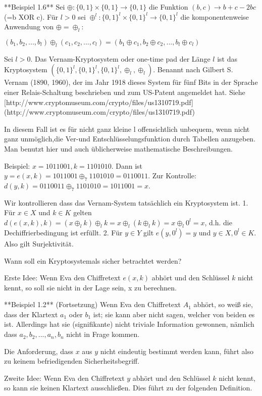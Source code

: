 \documentclass[a4paper]{article}
\begin{document}
\begin{multicols}{3}
**Beispiel 1.6** Sei $\oplus:\{0,1\}\times\{0,1\}\rightarrow\{0,1\}$ die Funktion $(b,c)\rightarrow b+c-2bc$ (=b XOR c).
Für $l>0$ sei $\oplus^l:\{0,1\}^l\times\{0,1\}^l\rightarrow\{0,1\}^l$ die komponentenweise Anwendung von $\oplus=\oplus_l$:

$(b_1,b_2,...,b_l)\oplus_l(c_1,c_2,...,c_l) = (b_1\oplus c_1,b_2\oplus c_2,...,b_l\oplus c_l)$

Sei $l>0$. Das Vernam-Kryptosystem oder one-time pad der Länge $l$ ist das Kryptosystem $(\{0,1\}^l,\{0,1\}^l,\{0,1\}^l,\oplus_l,\oplus_l)$. Benannt nach Gilbert S. Vernam (1890, 1960), der im Jahr 1918 dieses System für fünf Bits in der Sprache einer Relais-Schaltung beschrieben und zum US-Patent angemeldet hat. Siehe [http://www.cryptomuseum.com/crypto/files/us1310719.pdf](http://www.cryptomuseum.com/crypto/files/us1310719.pdf)

In diesem Fall ist es für nicht ganz kleine l offensichtlich unbequem, wenn nicht ganz unmöglich,die Ver-und Entschlüsselungsfunktion durch Tabellen anzugeben. Man benutzt hier und auch üblicherweise mathematische Beschreibungen.

Beispiel: $x=1011001,k=1101010$. Dann ist $y=e(x,k)=1011001\oplus_7 1101010 = 0110011$. Zur Kontrolle: $d(y,k) = 0110011\oplus_7 1101010 = 1011001 =x$.

Wir kontrollieren dass das Vernam-System tatsächlich ein Kryptosystem ist.
1. Für $x\in X$ und $k\in K$ gelten $d(e(x,k),k)=(x\oplus_l k)\oplus_l k=x\oplus_l(k\oplus_l k) =x\oplus_l 0^l=x$, d.h. die Dechiffrierbedingung ist erfüllt.
2. Für $y\in Y$ gilt $e(y,0^l) =y$ und $y\in X,0^l\in K$. Also gilt Surjektivität.

Wann soll ein Kryptosystemals sicher betrachtet werden?

Erste Idee: Wenn Eva den Chiffretext $e(x,k)$ abhört und den Schlüssel $k$ nicht kennt, so soll sie nicht in der Lage sein, x zu berechnen.

**Beispiel 1.2** (Fortsetzung) Wenn Eva den Chiffretext $A_1$ abhört, so weiß sie, dass der Klartext $a_1$ oder $b_1$ ist; sie kann aber nicht sagen, welcher von beiden es ist. Allerdings hat sie (signifikante) nicht triviale Information gewonnen, nämlich dass $a_2,b_2,...,a_n,b_n$ nicht in Frage kommen.

Die Anforderung, dass $x$ aus $y$ nicht eindeutig bestimmt werden kann, führt also zu keinem befriedigenden Sicherheitsbegriff.

Zweite Idee: Wenn Eva den Chiffretext $y$ abhört und den Schlüssel $k$ nicht kennt, so kann sie keinen Klartext ausschließen. Dies führt zu der folgenden Definition.


\end{multicols}
\end{document}
